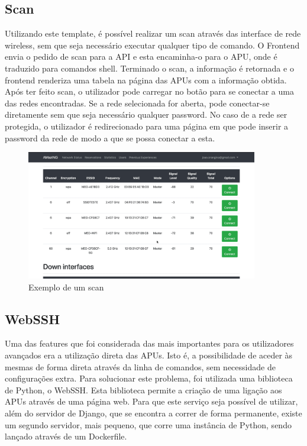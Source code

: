 \subsection{Scan}
Utilizando este template, é possível realizar um scan através das interface de rede wireless, sem que seja necessário executar qualquer tipo de comando. O Frontend envia o pedido de scan para a API e esta encaminha-o para o APU, onde é traduzido para comandos shell. Terminado o scan, a informação é retornada e o frontend renderiza uma tabela na página das APUs com a informação obtida.\newline
Após ter feito scan, o utilizador pode carregar no botão para se conectar a uma das redes encontradas. Se a rede selecionada for aberta, pode conectar-se diretamente sem que seja necessário qualquer password. No caso de a rede ser protegida, o utilizador é redirecionado para uma página em que pode inserir a password da rede de modo a que se possa conectar a esta.
\begin{figure}[!ht]
    \centering
    \includegraphics[width=0.9\textwidth]{images/scan_results.png}
    \caption{Exemplo de um scan}
    \label{fig:scannetwork}
\end{figure}

\subsection{WebSSH}
Uma das features que foi considerada das mais importantes para os utilizadores avançados era a utilização direta das APUs. Isto é, a possibilidade de aceder às mesmas de forma direta através da linha de comandos, sem necessidade de configurações extra. Para solucionar este problema, foi utilizada uma biblioteca de Python, o WebSSH. Esta biblioteca permite a criação de uma ligação aos APUs através de uma página web. Para que este serviço seja possível de utilizar, além do servidor de Django, que se encontra a correr de forma permanente, existe um segundo servidor, mais pequeno, que corre uma instância de Python, sendo lançado através de um Dockerfile.\hfill\break

